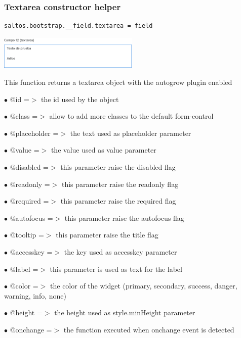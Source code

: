 \documentclass[a4paper]{article}
\begin{document}
\hypertarget{toc58}{}
\subsubsection{Textarea constructor helper}

\begin{lstlisting}
saltos.bootstrap.__field.textarea = field
\end{lstlisting}

\begin{center}\includegraphics[width=0.5\textwidth]{../ujest/snaps/test-bootstrap-js-bootstrap-campo-12-textarea-1-snap.png}\end{center}

This function returns a textarea object with the autogrow plugin enabled

\begin{compactitem}
\item[\color{myblue}$\bullet$] @id          =$>$ the id used by the object
\item[\color{myblue}$\bullet$] @class       =$>$ allow to add more classes to the default form-control
\item[\color{myblue}$\bullet$] @placeholder =$>$ the text used as placeholder parameter
\item[\color{myblue}$\bullet$] @value       =$>$ the value used as value parameter
\item[\color{myblue}$\bullet$] @disabled    =$>$ this parameter raise the disabled flag
\item[\color{myblue}$\bullet$] @readonly    =$>$ this parameter raise the readonly flag
\item[\color{myblue}$\bullet$] @required    =$>$ this parameter raise the required flag
\item[\color{myblue}$\bullet$] @autofocus   =$>$ this parameter raise the autofocus flag
\item[\color{myblue}$\bullet$] @tooltip     =$>$ this parameter raise the title flag
\item[\color{myblue}$\bullet$] @accesskey   =$>$ the key used as accesskey parameter
\item[\color{myblue}$\bullet$] @label       =$>$ this parameter is used as text for the label
\item[\color{myblue}$\bullet$] @color       =$>$ the color of the widget (primary, secondary, success, danger, warning, info, none)
\item[\color{myblue}$\bullet$] @height      =$>$ the height used as style.minHeight parameter
\item[\color{myblue}$\bullet$] @onchange    =$>$ the function executed when onchange event is detected
\end{compactitem}
\end{document}
